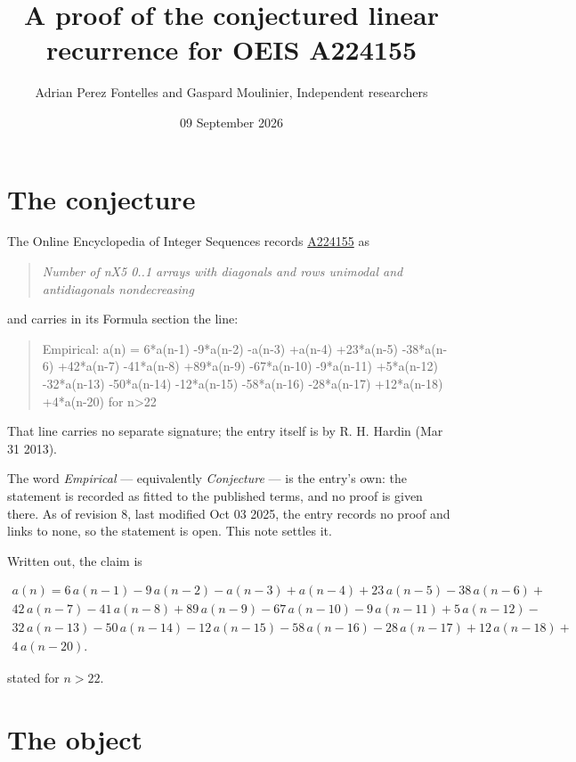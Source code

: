 \documentclass[11pt]{article}
\title{A proof of the conjectured linear recurrence for OEIS A224155}
\author{Adrian Perez Fontelles and Gaspard Moulinier, Independent researchers}
\date{09 September 2026}
\theoremstyle{definition}
\begin{document}
\maketitle
\section{The conjecture}

The Online Encyclopedia of Integer Sequences records \href{https://oeis.org/A224155}{A224155} as

\begin{quote}\itshape Number of nX5 0..1 arrays with diagonals and rows unimodal and antidiagonals nondecreasing\end{quote}

and carries in its Formula section the line:

\begin{quote}\ttfamily Empirical: a(n) = 6*a(n-1) -9*a(n-2) -a(n-3) +a(n-4) +23*a(n-5) -38*a(n-6) +42*a(n-7) -41*a(n-8) +89*a(n-9) -67*a(n-10) -9*a(n-11) +5*a(n-12) -32*a(n-13) -50*a(n-14) -12*a(n-15) -58*a(n-16) -28*a(n-17) +12*a(n-18) +4*a(n-20) for n>22\end{quote}

That line carries no separate signature; the entry itself is by R. H. Hardin (Mar 31 2013).

The word {\itshape Empirical} --- equivalently {\itshape Conjecture} --- is the entry's own: the statement is recorded as fitted to the published terms, and no proof is given there. As of revision 8, last modified Oct 03 2025, the entry records no proof and links to none, so the statement is open. This note settles it.

Written out, the claim is

\begin{multline*} a(n) = 6\,a(n-1) - 9\,a(n-2) - a(n-3) + a(n-4) + 23\,a(n-5) - 38\,a(n-6) + \\ 42\,a(n-7) - 41\,a(n-8) + 89\,a(n-9) - 67\,a(n-10) - 9\,a(n-11) + 5\,a(n-12) - \\ 32\,a(n-13) - 50\,a(n-14) - 12\,a(n-15) - 58\,a(n-16) - 28\,a(n-17) + 12\,a(n-18) + \\ 4\,a(n-20). \end{multline*}

stated for $n > 22$.

\section{The object}
\end{document}

